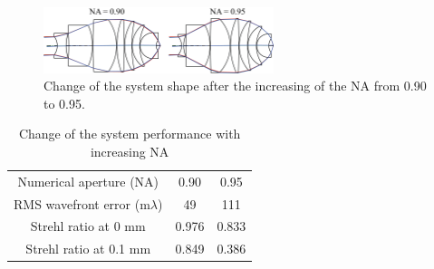 \begin{figure}[h!]
    \centering
    \includegraphics[width=0.6\textwidth]{chapter-4/figures/Vollrath_NA90295.png}
    \caption{Change of the system shape after the increasing of the NA from 0.90 to 0.95.}
    \label{fig: vollrathNA90295}
\end{figure}

\setlength{\arrayrulewidth}{.5mm}
\setlength{\tabcolsep}{18pt}
\renewcommand{\arraystretch}{1.2}
\begin{table}[h!]
    \centering
    \captionsetup{justification=centering}
    \caption{Change of the system performance with increasing NA}
    \label{table: NAchange}
    \vspace{-1em}
    \begin{tabular}{ c c c }
    \hline 
     Numerical aperture (NA) & 0.90 & 0.95\\ 
     \cmidrule{2-3}
    RMS wavefront error (m$\lambda$) & 49 & 111  \\ 
    Strehl ratio at 0 mm & 0.976 & 0.833\\
    Strehl ratio at 0.1 mm & 0.849 & 0.386\\
    \hline
    \end{tabular}
\end{table}

